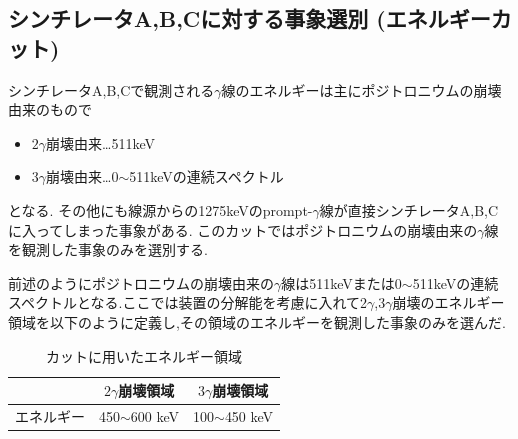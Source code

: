 \subsection{シンチレータA,B,Cに対する事象選別 (エネルギーカット)}
シンチレータA,B,Cで観測される$\gamma$線のエネルギーは主にポジトロニウムの崩壊由来のもので
\begin{itemize}
		\item $2\gamma$崩壊由来…511keV
		\item $3\gamma$崩壊由来…0$\sim$511keVの連続スペクトル
\end{itemize}
となる.
その他にも線源からの1275keVのprompt-$\gamma$線が直接シンチレータA,B,Cに入ってしまった事象がある.
このカットではポジトロニウムの崩壊由来の$\gamma$線を観測した事象のみを選別する.

前述のようにポジトロニウムの崩壊由来の$\gamma$線は511keVまたは0$\sim$511keVの連続スペクトルとなる.ここでは装置の分解能を考慮に入れて2$\gamma$,3$\gamma$崩壊のエネルギー領域を以下のように定義し,その領域のエネルギーを観測した事象のみを選んだ.
\begin{table}[htbp]
	\centering
		\caption{カットに用いたエネルギー領域}
		\begin{tabular}{|l|c|c|} \hline
			 & $2\gamma$崩壊領域 & $3\gamma$崩壊領域 \\ \hline
			エネルギー & 450$\sim$600 keV & 100$\sim$450 keV\\ \hline
		\end{tabular}
		\label{energy_cut_region}
\end{table}

